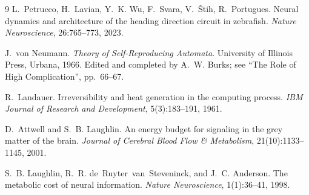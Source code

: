 \documentclass[11pt]{article}
\begin{document}
\begin{thebibliography}{9}
L.~Petrucco, H.~Lavian, Y.~K. Wu, F.~Svara, V.~\v{S}tih, R.~Portugues.
\newblock Neural dynamics and architecture of the heading direction
  circuit in zebrafish.
\newblock \emph{Nature Neuroscience}, 26:765--773, 2023.

J.~von Neumann.
\newblock \emph{Theory of Self-Reproducing Automata}.
\newblock University of Illinois Press, Urbana, 1966.
\newblock Edited and completed by A.~W. Burks; see ``The Role of High
  Complication'', pp.~66--67.

R.~Landauer.
\newblock Irreversibility and heat generation in the computing process.
\newblock \emph{IBM Journal of Research and Development}, 5(3):183--191, 1961.

D.~Attwell and S.~B. Laughlin.
\newblock An energy budget for signaling in the grey matter of the brain.
\newblock \emph{Journal of Cerebral Blood Flow \& Metabolism},
  21(10):1133--1145, 2001.

S.~B. Laughlin, R.~R. de~Ruyter~van~Steveninck, and J.~C. Anderson.
\newblock The metabolic cost of neural information.
\newblock \emph{Nature Neuroscience}, 1(1):36--41, 1998.

\end{thebibliography}
\end{document}
